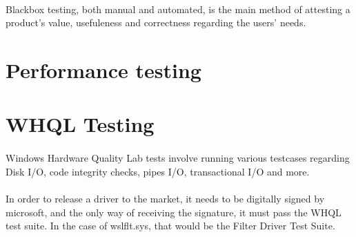         \paragraph{}
        Blackbox testing, both manual and automated, is the main method of attesting a product's value, usefuleness and correctness regarding
        the users' needs.
    \section{Performance testing}
        \paragraph{}        
    \section{WHQL Testing}
        \paragraph{}
        Windows Hardware Quality Lab\cite{whql} tests involve running various testcases regarding Disk I/O, code integrity checks, pipes I/O, transactional
        I/O and more.
        \paragraph{}
        In order to release a driver to the market, it needs to be digitally signed by microsoft, and the only way of receiving the signature, it
        must pass the WHQL test suite. In the case of wslflt.sys, that would be the Filter Driver Test Suite\cite{fdts}.